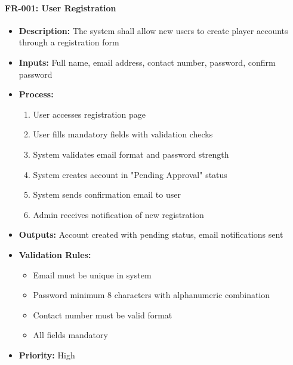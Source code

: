 \documentclass[12pt,a4paper]{article}
\begin{document}
\begin{enumerate}
\paragraph{FR-001: User Registration}
\begin{itemize}
    \item \textbf{Description:} The system shall allow new users to create player accounts through a registration form
    \item \textbf{Inputs:} Full name, email address, contact number, password, confirm password
    \item \textbf{Process:}
    \begin{enumerate}
        \item User accesses registration page
        \item User fills mandatory fields with validation checks
        \item System validates email format and password strength
        \item System creates account in "Pending Approval" status
        \item System sends confirmation email to user
        \item Admin receives notification of new registration
    \end{enumerate}
    \item \textbf{Outputs:} Account created with pending status, email notifications sent
    \item \textbf{Validation Rules:}
    \begin{itemize}
        \item Email must be unique in system
        \item Password minimum 8 characters with alphanumeric combination
        \item Contact number must be valid format
        \item All fields mandatory
    \end{itemize}
    \item \textbf{Priority:} High
\end{itemize}


\end{enumerate}
\end{document}
